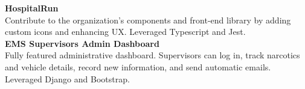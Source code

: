 \textbf{HospitalRun} \\
Contribute to the organization's components and front-end library by adding custom icons and enhancing UX. Leveraged Typescript and Jest.\\

\textbf{EMS Supervisors Admin Dashboard} \\
Fully featured administrative dashboard. Supervisors can log in, track narcotics and vehicle details, record new information, and send automatic emails. Leveraged Django and Bootstrap.\\